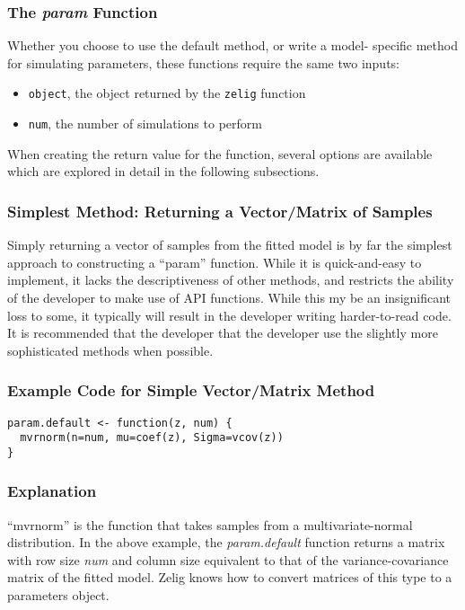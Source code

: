 \subsubsection{The \emph{param} Function}
Whether you choose to use the default method, or write a model- specific method for simulating parameters, these functions require the same two inputs:

\begin{itemize}
	\item{{\tt object}, the object returned by the {\tt zelig} function}
	\item{{\tt num}, the number of simulations to perform}
\end{itemize}

When creating the return value for the function, several options are available which are explored in detail in the following subsections.

\subsubsection{Simplest Method: Returning a Vector/Matrix of Samples}

Simply returning a vector of samples from the fitted model is by far the simplest approach to constructing a ``param'' function.  While it is quick-and-easy to implement, it lacks the descriptiveness of other methods, and restricts the ability of the developer to make use of API functions.  While this my be an insignificant loss to some, it typically will result in the developer writing harder-to-read code.  It is recommended that the developer that the developer use the slightly more sophisticated methods when possible.

\subsubsection{Example Code for Simple Vector/Matrix Method}
\begin{verbatim}
param.default <- function(z, num) {
  mvrnorm(n=num, mu=coef(z), Sigma=vcov(z))
}
\end{verbatim}

\subsubsection{Explanation}
``mvrnorm'' is the function that takes samples from a multivariate-normal distribution.  In the above example, the \emph{param.default} function returns a matrix with row size \emph{num} and column size equivalent to that of the variance-covariance matrix of the fitted model.  Zelig knows how to convert matrices of this type to a parameters object.


